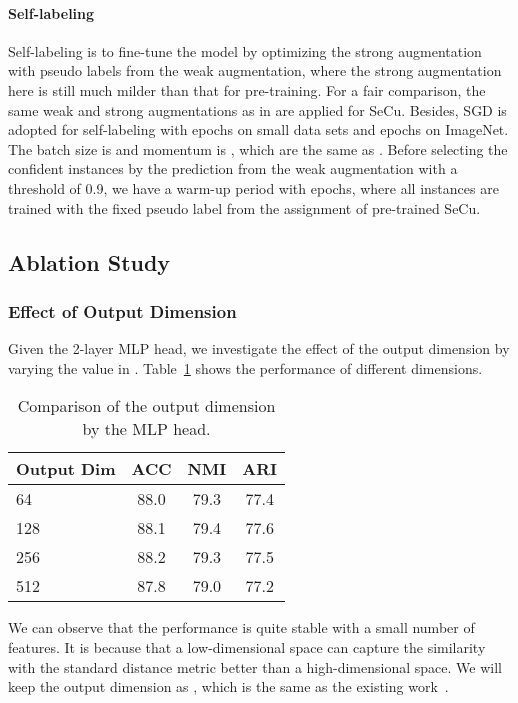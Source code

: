 \documentclass[10pt,twocolumn,letterpaper]{article}
\begin{document}
\paragraph{Self-labeling}
Self-labeling is to fine-tune the model by optimizing the strong augmentation with pseudo labels from the weak augmentation, where the strong augmentation here is still much milder than that for pre-training. For a fair comparison, the same weak and strong augmentations as in \cite{GansbekeVGPG20} are applied for SeCu. Besides, SGD is adopted for self-labeling with  epochs on small data sets and  epochs on ImageNet. The batch size is  and momentum is , which are the same as \cite{GansbekeVGPG20}. Before selecting the confident instances by the prediction from the weak augmentation with a threshold of 0.9, we have a warm-up period with  epochs, where all instances are trained with the fixed pseudo label from the assignment of pre-trained SeCu. 

\subsection{Ablation Study}

\subsubsection{Effect of Output Dimension}

Given the 2-layer MLP head, we investigate the effect of the output dimension by varying the value in . Table~\ref{ta:dim} shows the performance of different dimensions.

\begin{table}[!ht]
\centering
\begin{tabular}{|l|c|c|c|}\hline
Output Dim&ACC&NMI&ARI\\\hline
64&88.0&79.3&77.4\\
128&88.1&79.4&77.6\\
256&88.2&79.3&77.5\\
512&87.8&79.0&77.2\\\hline
\end{tabular}
\caption{Comparison of the output dimension by the MLP head. }\label{ta:dim}
\end{table}

We can observe that the performance is quite stable with a small number of features. It is because that a low-dimensional space can capture the similarity with the standard distance metric better than a high-dimensional space. We will keep the output dimension as , which is the same as the existing work~\cite{ZhongW0HDNL021}.
\end{document}
